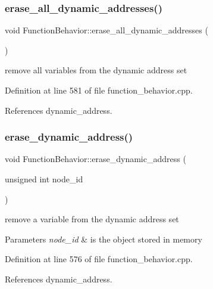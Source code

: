 \subsubsection{\texorpdfstring{erase\+\_\+all\+\_\+dynamic\+\_\+addresses()}{erase\_all\_dynamic\_addresses()}}
{\footnotesize\ttfamily void Function\+Behavior\+::erase\+\_\+all\+\_\+dynamic\+\_\+addresses (\begin{DoxyParamCaption}{ }\end{DoxyParamCaption})}



remove all variables from the dynamic address set 



Definition at line 581 of file function\+\_\+behavior.\+cpp.



References dynamic\+\_\+address.

\mbox{\label{classFunctionBehavior_abf565b14aa477638107ed1e11f20453f}} 
\subsubsection{\texorpdfstring{erase\+\_\+dynamic\+\_\+address()}{erase\_dynamic\_address()}}
{\footnotesize\ttfamily void Function\+Behavior\+::erase\+\_\+dynamic\+\_\+address (\begin{DoxyParamCaption}\item[{unsigned int}]{node\+\_\+id }\end{DoxyParamCaption})}



remove a variable from the dynamic address set 


\begin{DoxyParams}{Parameters}
{\em node\+\_\+id} & is the object stored in memory \\
\hline
\end{DoxyParams}


Definition at line 576 of file function\+\_\+behavior.\+cpp.



References dynamic\+\_\+address.

\mbox{\label{classFunctionBehavior_ad76eb3b6f53ee1ef999599f21459dd3f}} 
